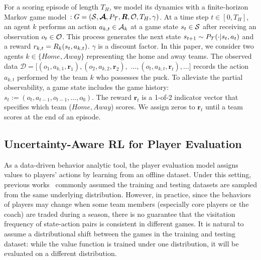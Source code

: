 \documentclass[letterpaper]{article} %
\newcommand{\horizon}{T_{H}}
\newcommand{\state}{s}
\newcommand{\observation}{o}
\newcommand{\action}{a}
\newcommand{\transition}{t}
\newcommand{\reward}{r}
\newcommand{\agentIndex}{k}
\newcommand{\gameIndex}{j}
\newcommand{\dataset}{\mathcal{D}}
\begin{document}
For a scoring episode of length $\horizon$, we model its dynamics with a finite-horizon Markov game model~\cite{Littman1994MarkovGame}$: G=(\mathcal{\MakeUppercase{\state}}, \boldsymbol{\mathcal{\MakeUppercase{\action}}}, P_{\mathcal{\MakeUppercase{\transition}}}, \boldsymbol{\MakeUppercase{\reward}}, \mathcal{\MakeUppercase{\observation}},\horizon,\gamma)$. 
At a time step $t\in[0,\horizon]$, an agent $\agentIndex$ performs an action $\action_{\agentIndex,t} \in \mathcal{\MakeUppercase{\action}}_{\agentIndex}$ at a game state $\state_{t} \in \mathcal{\MakeUppercase{\state}}$ after receiving an observation $\observation_{t} \in \mathcal{\MakeUppercase{\observation}}$. 
This process generates the next state $\state_{t+1} \sim P_{\mathcal{\MakeUppercase{\transition}}}(\cdot|\state_t, \action_t)$ and a reward
$\reward_{k,t}=\MakeUppercase{\reward}_{\agentIndex}(\state_{t},\action_{\agentIndex,t})$. $\gamma$ is a discount factor.
In this paper, we consider two agents $\agentIndex\in\{Home, Away\}$ representing the home and away teams. The observed data $\dataset=[(\observation_1,\action_{\agentIndex,1},\boldsymbol{\reward}_{1}),(\observation_2,\action_{\agentIndex,2},\boldsymbol{\reward}_{2}),$ $\ldots,(\observation_t,\action_{\agentIndex,t},\boldsymbol{\reward}_{t}),\ldots]$ records the action $\action_{\agentIndex,t}$ performed by the team $\agentIndex$ who possesses the puck.  To alleviate the partial observability, a game state includes the game history: $\state_{t} := (\observation_t,\action_{t-1},\observation_{t-1},\ldots,\observation_{0})$. The reward $\boldsymbol{\reward}_{t}$ is a 1-of-2 indicator vector that specifies which team ($Home, Away$) scores. We assign zeros to $\boldsymbol{\reward}_{t}$ until a team scores at the end of an episode.
\subsection{Uncertainty-Aware RL for Player Evaluation}\label{subsec:offline-problem}

As a data-driven behavior analytic tool, the player evaluation model assigns values to players' actions by learning from an offline dataset. Under this setting, previous works~\cite{Routley2015Markov,Liu2018DRL,Liu2020soccer,Decroos2019Actions} commonly assumed the training and testing datasets are sampled from the same underlying distribution. However, in practice, since the behaviors of players may change when some team members (especially core players or the coach) are traded during a season, there is no guarantee that the visitation frequency of state-action pairs is consistent in different games. It is natural to assume a distributional shift between the games in the training and testing dataset: while the value function is trained under one distribution, it will be evaluated on a different distribution.
\end{document}
